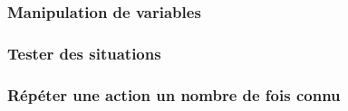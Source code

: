 \subsubsection{Manipulation de variables}
	\vspace{-0.75em}
	 

\subsubsection{Tester des situations}
	\vspace{-0.75em}
	 

\subsubsection{Répéter une action un nombre de fois \og connu \fg}
	\vspace{-0.75em}
	 
